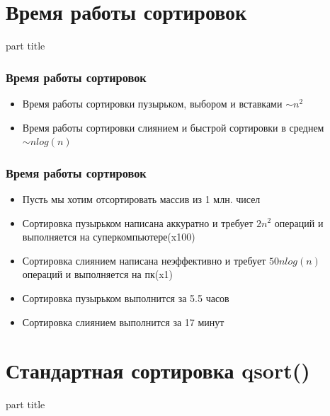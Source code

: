 \documentclass[14pt,pdf,hyperref={unicode}]{beamer}
\begin{document}
\section{Время работы сортировок}
\begin{frame}
\begin{center}
\begin{beamercolorbox}[sep=8pt,center]{part
title}
\insertsection
\end{beamercolorbox}
\end{center}
\end{frame}

\begin{frame}[fragile]
\frametitle{Время работы сортировок} 
\begin{itemize}
\item Время работы сортировки пузырьком, выбором и вставками $\sim n^2$ \\
\item Время работы сортировки слиянием и быстрой сортировки в среднем $\sim n log(n)$ \\
\end{itemize}
\end{frame}

\begin{frame}[fragile]
\frametitle{Время работы сортировок} 
\begin{itemize}
\item Пусть мы хотим отсортировать массив из 1 млн. чисел
\item Сортировка пузырьком написана аккуратно и требует $2n^2$ операций и выполняется на суперкомпьютере(x100)
\item Сортировка слиянием написана неэффективно и требует $50 n log(n)$ операций и выполняется на пк(x1)
\item Сортировка пузырьком выполнится за 5.5 часов \\
\item Сортировка слиянием выполнится за 17 минут \\
\end{itemize}
\end{frame}




\section{Стандартная сортировка qsort()}
\begin{frame}
\begin{center}
\begin{beamercolorbox}[sep=8pt,center]{part
title}
\insertsection
\end{beamercolorbox}
\end{center}
\end{frame}
\end{document}
